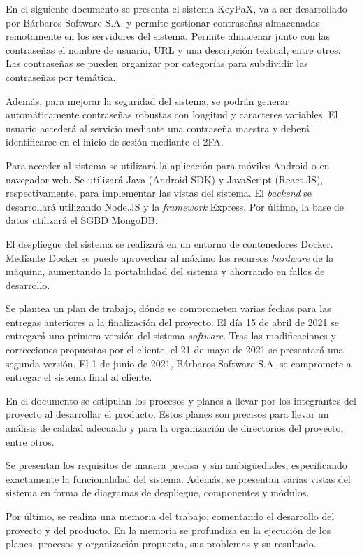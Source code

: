 \documentclass{article}
\begin{document}
En el siguiente documento se presenta el sistema KeyPaX, va a ser desarrollado por Bárbaros Software S.A. y permite gestionar contraseñas almacenadas remotamente en los servidores del sistema. Permite almacenar junto con las contraseñas el nombre de usuario, URL y una descripción textual, entre otros. Las contraseñas se pueden organizar por categorías para subdividir las contraseñas por temática.

Además, para mejorar la seguridad del sistema, se podrán generar automáticamente contraseñas robustas con longitud y caracteres variables. El usuario accederá al servicio mediante una contraseña maestra y deberá identificarse en el inicio de sesión mediante el 2FA.

Para acceder al sistema se utilizará la aplicación para móviles Android o en navegador web. Se utilizará Java (Android SDK) y JavaScript (React.JS), respectivamente, para implementar las vistas del sistema. El \textit{backend} se desarrollará utilizando Node.JS y la \textit{framework} Express. Por último, la base de datos utilizará el SGBD MongoDB. 

El despliegue del sistema se realizará en un entorno de contenedores Docker. Mediante Docker se puede aprovechar al máximo los recursos \textit{hardware} de la máquina, aumentando la portabilidad del sistema y ahorrando en fallos de desarrollo. 

Se plantea un plan de trabajo, dónde se comprometen varias fechas para las entregas anteriores a la finalización del proyecto.  El día 15 de abril de 2021 se entregará una primera versión del sistema \textit{software}. Tras las modificaciones y correcciones propuestas por el cliente, el 21 de mayo de 2021 se presentará una segunda versión. El 1 de junio de 2021, Bárbaros Software S.A. se compromete a entregar el sistema final al cliente.

En el documento se estipulan los procesos y planes a llevar por los integrantes del proyecto al desarrollar el producto. Estos planes son precisos para llevar un análisis de calidad adecuado y para la organización de directorios del proyecto, entre otros.

Se presentan los requisitos de manera precisa y sin ambigüedades, especificando exactamente la funcionalidad del sistema. Además, se presentan varias vistas del sistema en forma de diagramas de despliegue, componentes y módulos.

Por último, se realiza una memoria del trabajo, comentando el desarrollo del proyecto y del producto. En la memoria se profundiza en la ejecución de los planes, procesos y organización propuesta, sus problemas y su resultado. 
\end{document}
